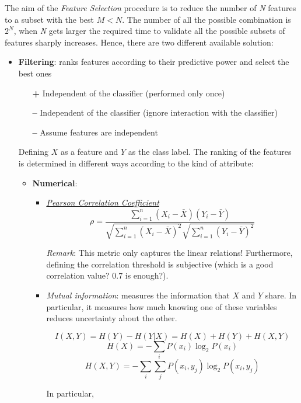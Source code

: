 The aim of the \emph{Feature Selection} procedure is to reduce the number of \emph{N} features to a subset with the best $M < N$. The number of all the possible combination is $2^N$, when \emph{N} gets larger the required time to validate all the possible subsets of features sharply increases. Hence, there are two different available solution:
\begin{itemize}
\item \textbf{Filtering}: ranks features according to their predictive power and select the best ones
  \begin{itemize}
    \item[{\bf +}] Independent of the classifier (performed only once)
    \item[{\bf --}] Independent of the classifier (ignore interaction with the classifier)
    \item[{\bf --}] Assume features are independent
  \end{itemize}

  Defining $X$ as a feature and $Y$ as the class label. The ranking of the features is determined in different ways according to the kind of attribute:
  \begin{itemize}
    \item \textbf{Numerical}:
    \begin{itemize}
      \item \href{https://en.wikipedia.org/wiki/Pearson_product-moment_correlation_coefficient}{\emph{Pearson Correlation Coefficient}}
      $$\rho = \frac{\sum_{i=1}^{n}(X_i - \bar{X})(Y_i - \bar{Y})}{\sqrt{\sum_{i=1}^{n}(X_i - \bar{X})^2}\sqrt{\sum_{i=1}^{n}(Y_i - \bar{Y})^2}}$$

      \emph{Remark}: This metric only captures the linear relations! Furthermore, defining the correlation threshold is subjective (which is a good correlation value? 0.7 is enough?).

      \item \emph{Mutual information}: measures the information that $X$ and $Y$ share. In particular, it measures how much knowing one of these variables reduces uncertainty about the other. 

      $$ I(X,Y) = H(Y) - H(Y|X) = H(X) + H(Y) + H(X,Y)$$
      $$ H(X) = - \sum_{i}P(x_i)\log_2 P(x_i)$$
      $$ H(X,Y) = - \sum_{i}\sum_{j}P(x_i, y_j)\log_2 P(x_i, y_j)$$

      In particular,


\end{itemize}
\end{itemize}
\end{itemize}
